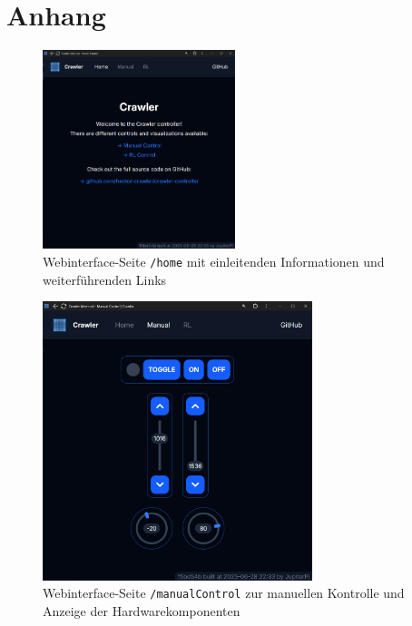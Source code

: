 \section*{Anhang}
\label{sec:anhang}

\label{fig:webinterface_screenshots}

\begin{figure}[H]
    \includegraphics[width=0.5\textwidth]{photos/webinterface_home.png}
    \caption{Webinterface-Seite \texttt{/home} mit einleitenden Informationen und weiterführenden Links}
\end{figure}

\begin{figure}[H]
	\includegraphics[width=0.7\textwidth]{photos/webinterface_manualControl.png}
    \caption{Webinterface-Seite \texttt{/manualControl} zur manuellen Kontrolle und Anzeige der Hardwarekomponenten}
\end{figure}

